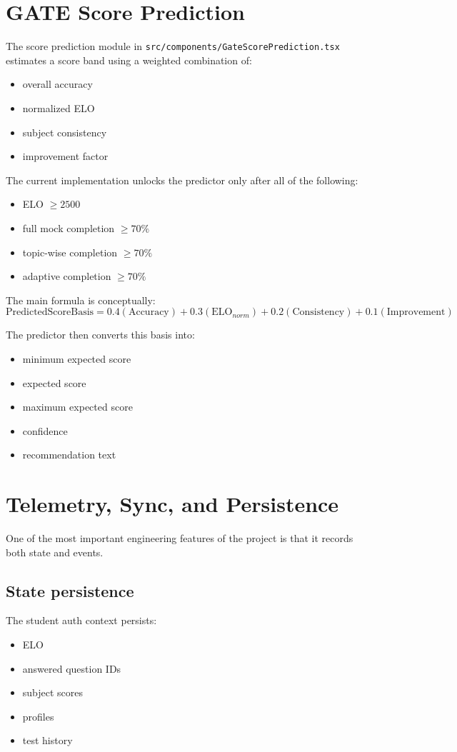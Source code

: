 \documentclass[10pt,twocolumn,a4paper]{article}
\newcommand{\tech}[1]{\texttt{#1}}
\begin{document}
\section{GATE Score Prediction}
The score prediction module in \tech{src/components/GateScorePrediction.tsx} estimates a score band using a weighted combination of:

\begin{itemize}
  \item overall accuracy
  \item normalized ELO
  \item subject consistency
  \item improvement factor
\end{itemize}

The current implementation unlocks the predictor only after all of the following:
\begin{itemize}
  \item ELO $\geq 2500$
  \item full mock completion $\geq 70\%$
  \item topic-wise completion $\geq 70\%$
  \item adaptive completion $\geq 70\%$
\end{itemize}

The main formula is conceptually:
\[
\text{PredictedScoreBasis} =
0.4(\text{Accuracy}) +
0.3(\text{ELO}_{norm}) +
0.2(\text{Consistency}) +
0.1(\text{Improvement})
\]

The predictor then converts this basis into:
\begin{itemize}
  \item minimum expected score
  \item expected score
  \item maximum expected score
  \item confidence
  \item recommendation text
\end{itemize}

\section{Telemetry, Sync, and Persistence}
One of the most important engineering features of the project is that it records both state and events.

\subsection{State persistence}
The student auth context persists:
\begin{itemize}
  \item ELO
  \item answered question IDs
  \item subject scores
  \item profiles
  \item test history
\end{itemize}
\end{document}
